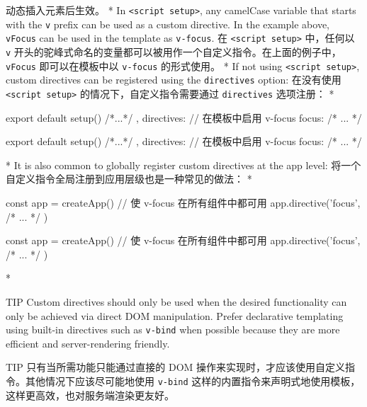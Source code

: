 \begin{paracol}{2}
动态插入元素后生效。
\switchcolumn[0]*%
In \texttt{\textless{}script\ setup\textgreater{}}, any camelCase
variable that starts with the \texttt{v} prefix can be used as a custom
directive. In the example above, \texttt{vFocus} can be used in the
template as \texttt{v-focus}.
\switchcolumn
在 \texttt{\textless{}script\ setup\textgreater{}} 中，任何以 \texttt{v}
开头的驼峰式命名的变量都可以被用作一个自定义指令。在上面的例子中，\texttt{vFocus}
即可以在模板中以 \texttt{v-focus} 的形式使用。
\switchcolumn[0]*%
If not using \texttt{\textless{}script\ setup\textgreater{}}, custom
directives can be registered using the \texttt{directives} option:
\switchcolumn
在没有使用 \texttt{\textless{}script\ setup\textgreater{}}
的情况下，自定义指令需要通过 \texttt{directives} 选项注册： 
\switchcolumn[0]*%
\begin{codeJs}
export default {
  setup() {
    /*...*/
  },
  directives: {
    // 在模板中启用 v-focus
    focus: {
      /* ... */
    }
  }
}
\end{codeJs}
\switchcolumn
\begin{codeJs}
export default {
  setup() {
    /*...*/
  },
  directives: {
    // 在模板中启用 v-focus
    focus: {
      /* ... */
    }
  }
}
\end{codeJs}
\switchcolumn[0]*%
It is also common to globally register custom directives at the app
level:
\switchcolumn
将一个自定义指令全局注册到应用层级也是一种常见的做法：
\switchcolumn[0]*%
\begin{codeJs}
const app = createApp({})
// 使 v-focus 在所有组件中都可用
app.directive('focus', {
  /* ... */
})
\end{codeJs}
\switchcolumn
\begin{codeJs}
const app = createApp({})
// 使 v-focus 在所有组件中都可用
app.directive('focus', {
  /* ... */
})
\end{codeJs}
\switchcolumn[0]*%
\begin{vueQuote}{TIP}
Custom directives should only be used when the desired functionality can
only be achieved via direct DOM manipulation. Prefer declarative
templating using built-in directives such as \texttt{v-bind} when
possible because they are more efficient and server-rendering friendly.
\end{vueQuote} 
\switchcolumn
\begin{vueQuote}{TIP}
只有当所需功能只能通过直接的 DOM
操作来实现时，才应该使用自定义指令。其他情况下应该尽可能地使用
\texttt{v-bind}
这样的内置指令来声明式地使用模板，这样更高效，也对服务端渲染更友好。
\end{vueQuote} 
\end{paracol}

